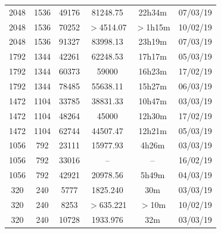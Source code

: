 \documentclass[11pt,a4paper]{report}
\begin{document}
\begin{itemize}
\begin{center}
\begin{tabular}{ c c c | c c c }
  2048 & 1536 & 49176 & 81248.75 & 22h34m & 07/03/19 \\
  2048 & 1536 & 70252 & $>$4514.07 & $>$1h15m & 10/02/19 \\
  2048 & 1536 & 91327 & 83998.13 & 23h19m & 07/03/19 \\
  1792 & 1344 & 42261 & 62248.53 & 17h17m & 05/03/19 \\
  1792 & 1344 & 60373 & 59000 & 16h23m & 17/02/19 \\
  1792 & 1344 & 78485 & 55638.11 & 15h27m & 06/03/19 \\
  1472 & 1104 & 33785 & 38831.33 & 10h47m & 03/03/19 \\
  1472 & 1104 & 48264 & 45000 & 12h30m & 17/02/19 \\
  1472 & 1104 & 62744 & 44507.47 & 12h21m & 05/03/19 \\
  1056 & 792 & 23111 & 15977.93 & 4h26m & 03/03/19 \\
  1056 & 792 & 33016 & -- & -- & 16/02/19 \\ %
  1056 & 792 & 42921 & 20978.56 & 5h49m & 04/03/19 \\
  320 & 240 & 5777 & 1825.240 & 30m & 03/03/19 \\
  320 & 240 & 8253 & $>$635.221 & $>$10m & 10/02/19 \\
  320 & 240 & 10728 & 1933.976 & 32m & 03/03/19 \\
  \end{tabular}
  \end{center}


\end{itemize}
\end{document}
